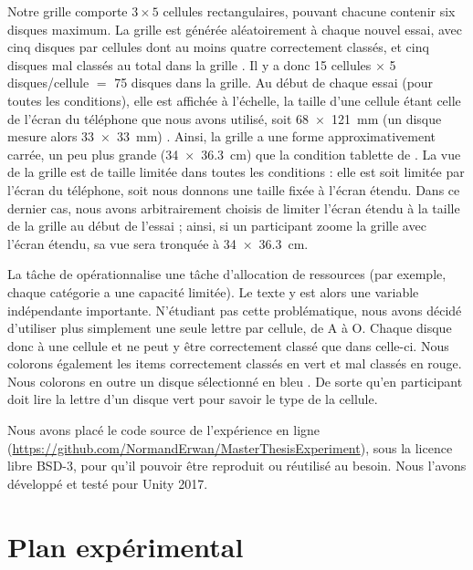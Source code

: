 Notre grille comporte $3 \times 5$ cellules rectangulaires, pouvant chacune contenir six disques maximum. La grille est générée aléatoirement à chaque nouvel essai, avec cinq disques par cellules dont au moins quatre correctement classés, et cinq disques mal classés au total dans la grille . Il y a donc 15 cellules $\times$ 5 disques/cellule $=$ 75 disques dans la grille. Au début de chaque essai (pour toutes les conditions), elle est affichée à l'échelle, la taille d'une cellule étant celle de l'écran du téléphone que nous avons utilisé, soit \SI{68x121}{\mm} (un disque mesure alors \SI{33x33}{\mm}) . Ainsi, la grille a une forme approximativement carrée, un peu plus grande (\SI{34x36.3}{\cm}) que la condition tablette de \cite{Raedle2014}. La vue de la grille est de taille limitée dans toutes les conditions : elle est soit limitée par l'écran du téléphone, soit nous donnons une taille fixée à l'écran étendu. Dans ce dernier cas, nous avons arbitrairement choisis de limiter l'écran étendu à la taille de la grille au début de l'essai ; ainsi, si un participant zoome la grille avec l'écran étendu, sa vue sera tronquée à \SI{34x36.3}{\cm}.


La tâche de \cite{Liu2014} opérationnalise une tâche d'allocation de ressources (par exemple, chaque catégorie a une capacité limitée). Le texte y est alors une variable indépendante importante. N'étudiant pas cette problématique, nous avons décidé d'utiliser plus simplement une seule lettre par cellule, de A à O. Chaque disque  donc à une cellule et ne peut y être correctement classé que dans celle-ci. Nous colorons également les items correctement classés en vert et mal classés en rouge. Nous colorons en outre un disque sélectionné en bleu . De sorte qu'en participant doit lire la lettre d'un disque vert pour savoir le type de la cellule.

Nous avons placé le code source de l'expérience en ligne (\url{https://github.com/NormandErwan/MasterThesisExperiment}), sous la licence libre BSD-3, pour qu'il pouvoir être reproduit ou réutilisé au besoin. Nous l'avons développé et testé pour Unity 2017.


\section{Plan expérimental}
\label{sec:experiment_design}

